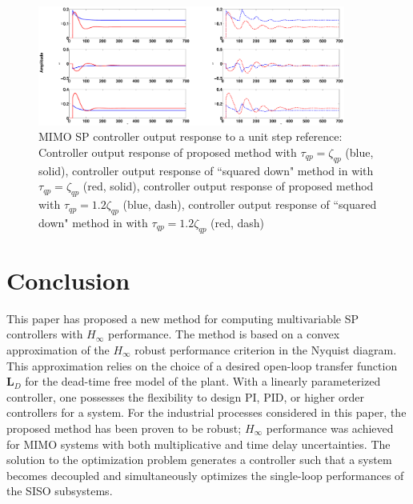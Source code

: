 \documentclass[A4, 10pt, conference]{ieeeconf}
\renewcommand{\vec}[1]{\mathbf{#1}}
\begin{document}
\begin{figure}[]
\centering
{}
\centerline{\includegraphics[width=0.9\textwidth]{pics/Rob_comp_LD35_in2.eps}}
\caption{MIMO SP controller output response to a unit step reference: Controller output response of proposed method with $\tau_{qp}=\zeta_{qp}$ (blue, solid), controller output response of ``squared down" method in \cite{RC06} with $\tau_{qp}=\zeta_{qp}$ (red, solid), controller output response of proposed method with $\tau_{qp}=1.2\zeta_{qp}$ (blue, dash), controller output response of ``squared down" method in \cite{RC06} with $\tau_{qp}=1.2\zeta_{qp}$ (red, dash)}
\label{fig:shell_in}
\end{figure}

\section{Conclusion}
\label{sec:5}
This paper has proposed a new method for computing multivariable SP controllers with $H_\infty$ performance. The method is based on a convex approximation of the $H_\infty$ robust performance criterion in the Nyquist diagram. This approximation relies on the choice of a desired open-loop transfer function $\vec{L}_D$ for the dead-time free model of the plant. With a linearly parameterized controller, one possesses the flexibility to design PI, PID, or higher order controllers for a system. For the industrial processes considered in this paper, the proposed method has been proven to be robust; $H_{\infty}$ performance was achieved for MIMO systems with both multiplicative and time delay uncertainties. The solution to the optimization problem generates a controller such that a system becomes decoupled and simultaneously optimizes the single-loop performances of the SISO subsystems.
\end{document}
